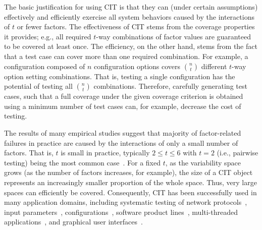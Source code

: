 \documentclass[EPiC]{easychair}
\begin{document}
The basic justification for using CIT is that they can (under certain assumptions) effectively and efficiently exercise all system behaviors caused by the interactions of $t$ or fewer factors. The effectiveness of CIT stems from the coverage properties it provides; e.g., all required $t$-way combinations of factor values are guaranteed to be covered at least once. The efficiency, on the other hand, stems from the fact that a test case can cover more than one required combination. For example, a configuration composed of $n$ configuration options covers $n \choose t$ different $t$-way option setting combinations. That is, testing a single configuration has the potential of testing all $n \choose t$ combinations. Therefore, carefully generating test cases, such that a full coverage under the given coverage criterion is obtained using a minimum number of test cases can, for example,  decrease the cost of testing.

The results of many empirical studies suggest that majority of factor-related failures in practice are caused by the interactions of only a small number of factors. That is, $t$ is small in practice, typically $2 \leq t \leq 6$ with $t$$=$$2$ (i.e., pairwise testing) being the most common case~\cite{cohen1996combinatorial,cohen1997aetg,czerwonka2006pairwise,dalal1998model}. For a fixed $t$, as the variability space grows (as the number of factors increases, for example), the size of a CIT object represents an increasingly smaller proportion of the whole space. Thus, very large spaces can efficiently be covered. Consequently, CIT has been successfully used in many application domains, including systematic testing of network protocols~\cite{burroughs1994improved,williams1996practical}, input parameters~\cite{schroeder2002generating}, configurations~\cite{kuhn2008practical,yilmaz2006covering}, software product lines~\cite{johansen2012algorithm}, multi-threaded applications~\cite{lei2007combinatorial}, and graphical user interfaces~\cite{yuan2011gui}. 
\end{document}
